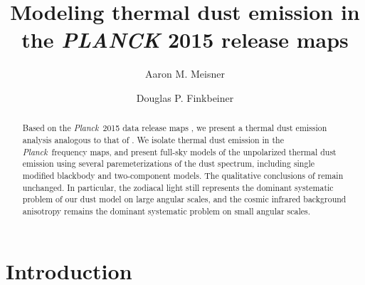 \documentclass{emulateapj}
\newcommand{\PLANCK}{{\it Planck}}
\begin{document}
\title{Modeling thermal dust emission in the {\it PLANCK} 2015 release maps}
\author{Aaron M. Meisner}
\author{Douglas P. Finkbeiner}

\begin{abstract}

Based on the \PLANCK~2015 data release maps \citep{planck2015}, we present a 
thermal dust emission analysis analogous to that of \cite{meisner15}. We 
isolate thermal dust emission in the \PLANCK~frequency maps, and present 
full-sky models of the unpolarized thermal dust emission using several 
paremeterizations of the dust spectrum, including single modified blackbody and
two-component models. The qualitative conclusions of \cite{meisner15} remain 
unchanged. In particular, the zodiacal light still represents the dominant 
systematic problem of our dust model on large angular scales, and the cosmic 
infrared background anisotropy remains the dominant systematic problem on small
angular scales.


\end{abstract}


\section{Introduction}
\end{document}
